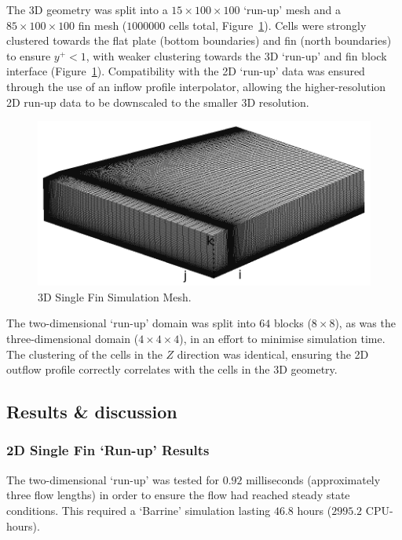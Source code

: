 The 3D geometry was split into a $15\times100\times100$ `run-up' mesh and a $85\times100\times100$ fin mesh ($1000000$ cells total, Figure~\ref{f:tc2:mesh}). Cells were strongly clustered towards the flat plate (bottom boundaries) and fin (north boundaries) to ensure $y^+<1$, with weaker clustering towards the 3D `run-up' and fin block interface (Figure~\ref{f:tc2:mesh}). Compatibility with the 2D `run-up' data was ensured through the use of an inflow profile interpolator, allowing the higher-resolution 2D run-up data to be downscaled to the smaller 3D resolution. 
%
\begin{figure}[htbp]
 \begin{center}
  \includegraphics[width=12cm]{./chap7-3Dsinglefin/figs/tc2-mesh.png}
  \caption{3D Single Fin Simulation Mesh.}
  \label{f:tc2:mesh}
 \end{center}
\end{figure}
%

The two-dimensional `run-up' domain was split into $64$ blocks ($8\times8$), as was the three-dimensional domain ($4\times4\times4$), in an effort to minimise simulation time. The clustering of the cells in the $Z$ direction was identical, ensuring the 2D outflow profile correctly correlates with the cells in the 3D geometry.

\subsection{Results \& discussion}
\subsubsection{2D Single Fin `Run-up' Results}
%
The two-dimensional `run-up' was tested for $0.92$ milliseconds (approximately three flow lengths) in order to ensure the flow had reached steady state conditions. This required a `Barrine' simulation lasting $46.8$ hours ($2995.2$ CPU-hours). 

